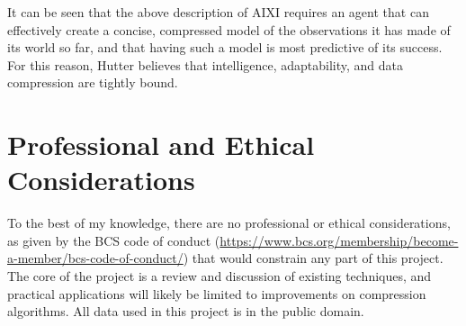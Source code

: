 It can be seen that the above description of AIXI requires an agent that can effectively create a concise, compressed model of the observations it has made of its world so far, and that having such a model is most predictive of its success. For this reason, Hutter believes that intelligence, adaptability, and data compression are tightly bound.

\section{Professional and Ethical Considerations}
\label{subsec:bcs}
To the best of my knowledge, there are no professional or ethical considerations, as given by the BCS code of conduct (\url{https://www.bcs.org/membership/become-a-member/bcs-code-of-conduct/}) that would constrain any part of this project. The core of the project is a review and discussion of existing techniques, and practical applications will likely be limited to improvements on compression algorithms. All data used in this project is in the public domain.




